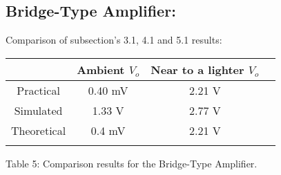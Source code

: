 \subsection{Bridge-Type Amplifier:}

Comparison of subsection's 3.1, 4.1 and 5.1 results: \hfill \break

\begin{center}
\begin{tabular}[.5cm]{c c c c}
\toprule \toprule
& \hspace{60pt} Ambient $V_{o}$ \hspace{60pt} & \hspace{65pt} Near to a lighter $V_{o}$ \hspace{65pt} \\
\midrule \midrule
Practical & 0.40 mV & 2.21 V \\
\cmidrule{1-3}
Simulated & 1.33 V & 2.77 V  \\
\cmidrule{1-3}
Theoretical & 0.4 mV & 2.21 V \\
\bottomrule
\linebreak
\end{tabular}
\linebreak Table 5: Comparison results for the Bridge-Type Amplifier.
\end{center}